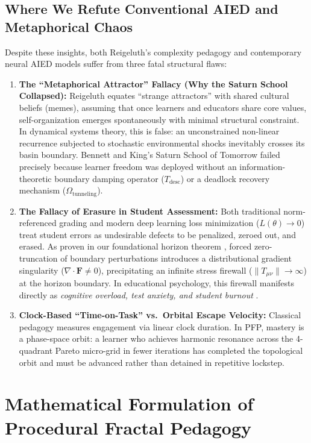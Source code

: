 \documentclass[10pt,twocolumn,a4paper]{article}
\begin{document}
\subsection{Where We Refute Conventional AIED and Metaphorical Chaos}
Despite these insights, both Reigeluth's complexity pedagogy and contemporary neural AIED models suffer from three fatal structural flaws:
\begin{enumerate}[leftmargin=*,nosep]
    \item \textbf{The ``Metaphorical Attractor'' Fallacy (Why the Saturn School Collapsed):} Reigeluth \cite[p.~27--29]{reigeluth2008chaos} equates ``strange attractors'' with shared cultural beliefs (memes), assuming that once learners and educators share core values, self-organization emerges spontaneously with minimal structural constraint. In dynamical systems theory, this is false: an unconstrained non-linear recurrence subjected to stochastic environmental shocks inevitably crosses its basin boundary. Bennett and King's \cite{bennett1991saturn} Saturn School of Tomorrow failed precisely because learner freedom was deployed without an information-theoretic boundary damping operator ($T_{\text{desc}}$) or a deadlock recovery mechanism ($\Omega_{\text{tunneling}}$).
    \item \textbf{The Fallacy of Erasure in Student Assessment:} Both traditional norm-referenced grading and modern deep learning loss minimization ($L(\theta) \to 0$) treat student errors as undesirable defects to be penalized, zeroed out, and erased. As proven in our foundational horizon theorem \cite{dagli2026pagecurve}, forced zero-truncation of boundary perturbations introduces a distributional gradient singularity ($\nabla \cdot \mathbf{F} \neq 0$), precipitating an infinite stress firewall ($\|T_{\mu\nu}\| \to \infty$) at the horizon boundary. In educational psychology, this firewall manifests directly as \textit{cognitive overload, test anxiety, and student burnout} \cite{sweller1988cognitive}.
    \item \textbf{Clock-Based ``Time-on-Task'' vs.\ Orbital Escape Velocity:} Classical pedagogy measures engagement via linear clock duration. In PFP, mastery is a phase-space orbit: a learner who achieves harmonic resonance across the 4-quadrant Pareto micro-grid in fewer iterations has completed the topological orbit and must be advanced rather than detained in repetitive lockstep.
\end{enumerate}

\section{Mathematical Formulation of Procedural Fractal Pedagogy}
\end{document}
